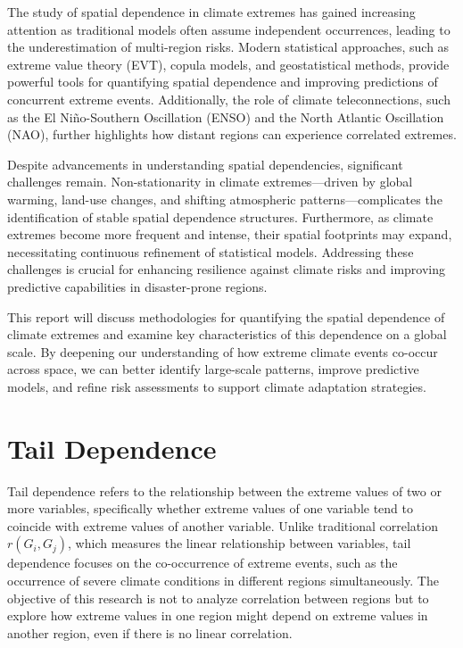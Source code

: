 \documentclass[
]{krantz}
\begin{document}
The study of spatial dependence in climate extremes has gained increasing attention as traditional models often assume independent occurrences, leading to the underestimation of multi-region risks. Modern statistical approaches, such as extreme value theory (EVT), copula models, and geostatistical methods, provide powerful tools for quantifying spatial dependence and improving predictions of concurrent extreme events. Additionally, the role of climate teleconnections, such as the El Niño-Southern Oscillation (ENSO) and the North Atlantic Oscillation (NAO), further highlights how distant regions can experience correlated extremes.

Despite advancements in understanding spatial dependencies, significant challenges remain. Non-stationarity in climate extremes---driven by global warming, land-use changes, and shifting atmospheric patterns---complicates the identification of stable spatial dependence structures. Furthermore, as climate extremes become more frequent and intense, their spatial footprints may expand, necessitating continuous refinement of statistical models. Addressing these challenges is crucial for enhancing resilience against climate risks and improving predictive capabilities in disaster-prone regions.

This report will discuss methodologies for quantifying the spatial dependence of climate extremes and examine key characteristics of this dependence on a global scale. By deepening our understanding of how extreme climate events co-occur across space, we can better identify large-scale patterns, improve predictive models, and refine risk assessments to support climate adaptation strategies.

\section{Tail Dependence}\label{tail-dependence}

Tail dependence refers to the relationship between the extreme values of two or more variables, specifically whether extreme values of one variable tend to coincide with extreme values of another variable. Unlike traditional correlation \(r(G_i, G_j)\), which measures the linear relationship between variables, tail dependence focuses on the co-occurrence of extreme events, such as the occurrence of severe climate conditions in different regions simultaneously. The objective of this research is not to analyze correlation between regions but to explore how extreme values in one region might depend on extreme values in another region, even if there is no linear correlation.
\end{document}
